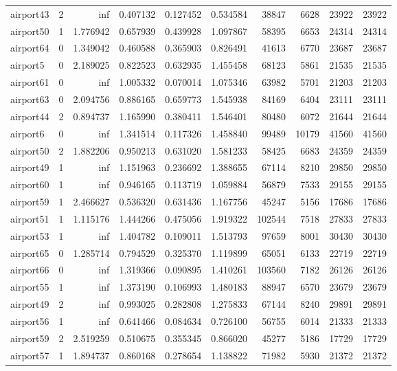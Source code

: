 \begin{longtable}{|l|r|r|r|r|r|r|r|r|r|}
airport43 & 2 & inf & 0.407132 & 0.127452 & 0.534584 & 38847 & 6628 & 23922 & 23922 \\
airport50 & 1 & 1.776942 & 0.657939 & 0.439928 & 1.097867 & 58395 & 6653 & 24314 & 24314 \\
airport64 & 0 & 1.349042 & 0.460588 & 0.365903 & 0.826491 & 41613 & 6770 & 23687 & 23687 \\
airport5 & 0 & 2.189025 & 0.822523 & 0.632935 & 1.455458 & 68123 & 5861 & 21535 & 21535 \\
airport61 & 0 & inf & 1.005332 & 0.070014 & 1.075346 & 63982 & 5701 & 21203 & 21203 \\
airport63 & 0 & 2.094756 & 0.886165 & 0.659773 & 1.545938 & 84169 & 6404 & 23111 & 23111 \\
airport44 & 2 & 0.894737 & 1.165990 & 0.380411 & 1.546401 & 80480 & 6072 & 21644 & 21644 \\
airport6 & 0 & inf & 1.341514 & 0.117326 & 1.458840 & 99489 & 10179 & 41560 & 41560 \\
airport50 & 2 & 1.882206 & 0.950213 & 0.631020 & 1.581233 & 58425 & 6683 & 24359 & 24359 \\
airport49 & 1 & inf & 1.151963 & 0.236692 & 1.388655 & 67114 & 8210 & 29850 & 29850 \\
airport60 & 1 & inf & 0.946165 & 0.113719 & 1.059884 & 56879 & 7533 & 29155 & 29155 \\
airport59 & 1 & 2.466627 & 0.536320 & 0.631436 & 1.167756 & 45247 & 5156 & 17686 & 17686 \\
airport51 & 1 & 1.115176 & 1.444266 & 0.475056 & 1.919322 & 102544 & 7518 & 27833 & 27833 \\
airport53 & 1 & inf & 1.404782 & 0.109011 & 1.513793 & 97659 & 8001 & 30430 & 30430 \\
airport65 & 0 & 1.285714 & 0.794529 & 0.325370 & 1.119899 & 65051 & 6133 & 22719 & 22719 \\
airport66 & 0 & inf & 1.319366 & 0.090895 & 1.410261 & 103560 & 7182 & 26126 & 26126 \\
airport55 & 1 & inf & 1.373190 & 0.106993 & 1.480183 & 88947 & 6570 & 23679 & 23679 \\
airport49 & 2 & inf & 0.993025 & 0.282808 & 1.275833 & 67144 & 8240 & 29891 & 29891 \\
airport56 & 1 & inf & 0.641466 & 0.084634 & 0.726100 & 56755 & 6014 & 21333 & 21333 \\
airport59 & 2 & 2.519259 & 0.510675 & 0.355345 & 0.866020 & 45277 & 5186 & 17729 & 17729 \\
airport57 & 1 & 1.894737 & 0.860168 & 0.278654 & 1.138822 & 71982 & 5930 & 21372 & 21372 \\

\end{longtable}
